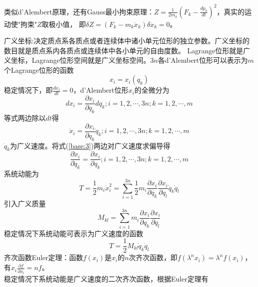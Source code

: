 \documentclass[12pt]{article}
\numberwithin{equation}{section}
\begin{document}
        类似d'Alembert原理，还有Gauss最小拘束原理：$Z=\frac{1}{2m_k}\left(F_k-\frac{dp_k}{dt}\right)^2$，真实的运动使"拘束"$Z$取极小值，
        即$\delta Z=(F_k-m_k\ddot{x}_k)\delta \ddot{x}_k=0$。

        广义坐标:决定质点系各质点或者连续体中诸小单元位形的独立参数。广义坐标的数目就是质点系内各质点或连续体中各小单元的自由度数。
        Lagrange位形就是广义坐标，Lagrange位形空间就是广义坐标空间。$3n$各d'Alembert位形可以表示为$m$个Lagrange位形的函数
        \begin{equation}\label{base:1}
            x_i=x_i(q_k)
        \end{equation}
        稳定情况下，即$\frac{dx_i}{dt}=0$，d'Alembert位形$x_i$的全微分为
        \begin{equation}\label{base:2}
            dx_i=\frac{\partial x_i}{\partial q_k}dq_k;i=1,2,\cdots,3n;k=1,2,\cdots,m
        \end{equation}
        等式两边除以$dt$得
        \begin{equation}\label{base:3}
            \dot{x}_i=\frac{\partial x_i}{\partial q_k}\dot{q}_k;i=1,2,\cdots,3n;k=1,2,\cdots,m
        \end{equation}
        $\dot{q}_k$为广义速度。将式(\ref{base:3})两边对广义速度求偏导得
        \begin{equation}\label{base:4}
            \frac{\partial \dot{x}_i}{\partial \dot{q}_k}=\frac{\partial x_i}{\partial q_k};i=1,2,\cdots,3n;k=1,2,\cdots,m
        \end{equation}
        系统动能为
        \begin{equation}\label{base:5}
            T=\frac{1}{2}m_i\dot{x}_i^2=\sum_{i=1}^{3n}\frac{1}{2}m_i\frac{\partial x_i}{\partial q_k}\frac{\partial x_i}{\partial q_l}\dot{q}_k\dot{q}_l
        \end{equation}
        引入广义质量
        \begin{equation}\label{base:6}
            M_{kl}=\sum_{i=1}^{3n}m_i\frac{\partial x_i}{\partial q_k}\frac{\partial x_i}{\partial q_l}
        \end{equation}
        稳定情况下系统动能可表示为广义速度的函数
        \begin{equation}\label{base:7}
            T=\frac{1}{2}M_{kl}\dot{q}_k\dot{q}_l
        \end{equation}
        齐次函数Euler定理：函数$f(x_i)$是$x_i$的$n$次齐次函数，即$f(\lambda^nx_i)=\lambda^nf(x_i)$，有$x_i\frac{\partial f}{\partial x_i}=nf$。\\
        稳定情况下系统动能是广义速度的二次齐次函数，根据Euler定理有
\end{document}
